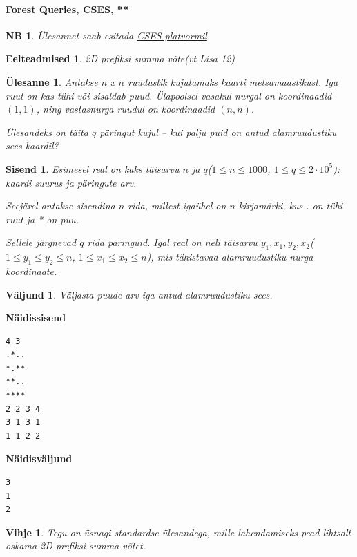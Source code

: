 \documentclass{trkut}
\newtheorem*{prereq}{Eelteadmised}
\newtheorem*{extra}{NB}
\newtheorem*{vihje}{Vihje}
\newtheorem*{Input}{Sisend}
\newtheorem*{Output}{Väljund}
\newtheorem*{Text}{Ülesanne}
\begin{document}
\paragraph{Forest Queries, CSES, **}
\begin{extra}
Ülesannet saab esitada \href{https://cses.fi/problemset/task/1652}{CSES platvormil}.
\end{extra}
\begin{prereq}
2D prefiksi summa võte(vt Lisa 12)
\end{prereq}
\begin{Text}
Antakse $n$ x $n$ ruudustik kujutamaks kaarti metsamaastikust. Iga ruut on kas tühi või sisaldab puud. Ülapoolsel vasakul nurgal on koordinaadid $(1, 1)$, ning vastasnurga ruudul on koordinaadid $(n, n)$.

Ülesandeks on täita $q$ päringut kujul -- kui palju puid on antud alamruudustiku sees kaardil?

\parencite{forest}
\end{Text}
\begin{Input}
Esimesel real on kaks täisarvu $n$ ja $q$($1\le n\le 1000$, $1\le q\le 2\cdot 10^5$): kaardi suurus ja päringute arv.

Seejärel antakse sisendina $n$ rida, millest igaühel on $n$ kirjamärki, kus . on tühi ruut ja * on puu.

Sellele järgnevad $q$ rida päringuid. Igal real on neli täisarvu $y_1, x_1, y_2, x_2$($1\le y_1\le y_2\le n$, $1\le x_1\le x_2\le n$), mis tähistavad alamruudustiku nurga koordinaate.

\end{Input}

\begin{Output}
Väljasta puude arv iga antud alamruudustiku sees.
\end{Output}



\textbf{Näidissisend}

\begin{verbatim}
4 3
.*..
*.**
**..
****
2 2 3 4
3 1 3 1
1 1 2 2
\end{verbatim}

\textbf{Näidisväljund}

\begin{verbatim}
3
1
2
\end{verbatim}


\begin{vihje}
Tegu on üsnagi standardse ülesandega, mille lahendamiseks pead lihtsalt oskama 2D prefiksi summa võtet.
\end{vihje}
\end{document}
